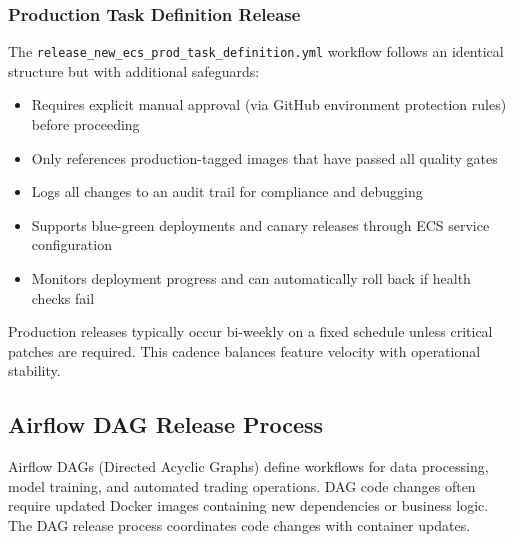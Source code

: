 \subsubsection{Production Task Definition Release}
The \texttt{release\_new\_ecs\_prod\_task\_definition.yml} workflow
follows an identical structure but with additional safeguards:
\begin{itemize}
  \item Requires explicit manual approval (via GitHub environment
    protection rules) before proceeding

  \item Only references production-tagged images that have passed all quality
    gates

  \item Logs all changes to an audit trail for compliance and debugging

  \item Supports blue-green deployments and canary releases through ECS
    service configuration

  \item Monitors deployment progress and can automatically roll back if
    health checks fail
\end{itemize}
Production releases typically occur bi-weekly on a fixed schedule unless
critical patches are required. This cadence balances feature velocity
with operational stability.

\subsection{Airflow DAG Release Process}
Airflow DAGs (Directed Acyclic Graphs) define workflows for data processing,
model training, and automated trading operations. DAG code changes
often require updated Docker images containing new dependencies or
business logic. The DAG release process coordinates code changes with container
updates.

